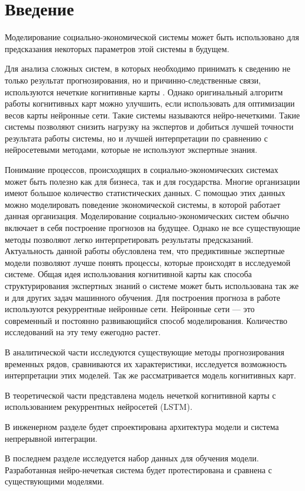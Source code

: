 \chapter*{Введение}
\label{sec:afterwords}

Моделирование социально-экономической системы может быть использовано для предсказания
некоторых параметров этой системы в будущем.

Для анализа сложных систем, в которых необходимо принимать к сведению
не только результат прогнозирования,
но и причинно-следственные связи,
используются нечеткие когнитивные карты \cite{osoba2019dags} \cite{kosko1986fuzzy}.
Однако оригинальный алгоритм работы когнитивных карт можно улучшить,
если использовать для оптимизации весов карты нейронные сети.
Такие системы называются нейро-нечеткими.
Такие системы позволяют снизить нагрузку на экспертов и
добиться лучшей точности результата работы системы, но и лучшей интерпретации по сравнению
с нейросетевыми методами, которые не используют экспертные знания.

Понимание процессов, происходящих в социально-экономических системах
может быть полезно как для бизнеса, так и для государства.
Многие организации имеют большое количество статистических данных.
С помощью этих данных можно моделировать поведение
экономической системы, в которой работает данная организация.
Моделирование социально-экономических систем обычно
включает в себя построение прогнозов на будущее.
Однако не все существующие методы позволяют
легко интерпретировать результаты предсказаний.
Актуальность данной работы обусловлена тем, что предиктивные экспертные модели
позволяют лучше понять процессы, которые происходят в
исследуемой системе. Общая идея использования когнитивной карты
как способа структурирования экспертных знаний о системе
может быть использована так же и для других задач машинного обучения.
Для построения прогноза в работе используются рекуррентные нейронные
сети. Нейронные сети --- это современный и постоянно
развивающийся способ моделирования. Количество исследований
на эту тему ежегодно растет.

В аналитической части исследуются существующие методы прогнозирования
временных рядов, сравниваются их характеристики, исследуется
возможность интерпретации этих моделей. Так же рассматривается
модель когнитивных карт.

В теоретической части представлена модель нечеткой когнитивной карты с использованием
рекуррентных нейросетей (LSTM).

В инженерном разделе будет спроектирована архитектура модели и
система непрерывной интеграции.

В последнем разделе исследуется набор данных для обучения модели.
Разработанная нейро-нечеткая система будет протестирована и сравнена
с существующими моделями.